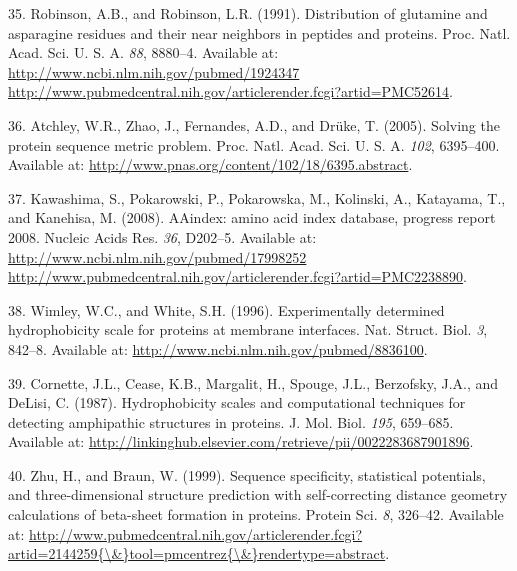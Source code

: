 \documentclass[12pt,a4paper,twoside]{book}
\theoremstyle{definition}
\theoremstyle{definition}
\theoremstyle{remark}
\begin{document}
\hypertarget{ref-Robinson1991}{}
35. Robinson, A.B., and Robinson, L.R. (1991). Distribution of glutamine
and asparagine residues and their near neighbors in peptides and
proteins. Proc. Natl. Acad. Sci. U. S. A. \emph{88}, 8880--4. Available
at:
\href{http://www.ncbi.nlm.nih.gov/pubmed/1924347\%20http://www.pubmedcentral.nih.gov/articlerender.fcgi?artid=PMC52614}{http://www.ncbi.nlm.nih.gov/pubmed/1924347 http://www.pubmedcentral.nih.gov/articlerender.fcgi?artid=PMC52614}.

\hypertarget{ref-Atchley2005}{}
36. Atchley, W.R., Zhao, J., Fernandes, A.D., and Drüke, T. (2005).
Solving the protein sequence metric problem. Proc. Natl. Acad. Sci. U.
S. A. \emph{102}, 6395--400. Available at:
\url{http://www.pnas.org/content/102/18/6395.abstract}.

\hypertarget{ref-Kawashima2008}{}
37. Kawashima, S., Pokarowski, P., Pokarowska, M., Kolinski, A.,
Katayama, T., and Kanehisa, M. (2008). AAindex: amino acid index
database, progress report 2008. Nucleic Acids Res. \emph{36}, D202--5.
Available at:
\href{http://www.ncbi.nlm.nih.gov/pubmed/17998252\%20http://www.pubmedcentral.nih.gov/articlerender.fcgi?artid=PMC2238890}{http://www.ncbi.nlm.nih.gov/pubmed/17998252 http://www.pubmedcentral.nih.gov/articlerender.fcgi?artid=PMC2238890}.

\hypertarget{ref-Wimley1996}{}
38. Wimley, W.C., and White, S.H. (1996). Experimentally determined
hydrophobicity scale for proteins at membrane interfaces. Nat. Struct.
Biol. \emph{3}, 842--8. Available at:
\url{http://www.ncbi.nlm.nih.gov/pubmed/8836100}.

\hypertarget{ref-Cornette1987}{}
39. Cornette, J.L., Cease, K.B., Margalit, H., Spouge, J.L., Berzofsky,
J.A., and DeLisi, C. (1987). Hydrophobicity scales and computational
techniques for detecting amphipathic structures in proteins. J. Mol.
Biol. \emph{195}, 659--685. Available at:
\url{http://linkinghub.elsevier.com/retrieve/pii/0022283687901896}.

\hypertarget{ref-Zhu1999}{}
40. Zhu, H., and Braun, W. (1999). Sequence specificity, statistical
potentials, and three-dimensional structure prediction with
self-correcting distance geometry calculations of beta-sheet formation
in proteins. Protein Sci. \emph{8}, 326--42. Available at:
\href{http://www.pubmedcentral.nih.gov/articlerender.fcgi?artid=2144259\%7B/\&\%7Dtool=pmcentrez\%7B/\&\%7Drendertype=abstract}{http://www.pubmedcentral.nih.gov/articlerender.fcgi?artid=2144259\{\textbackslash{}\&\}tool=pmcentrez\{\textbackslash{}\&\}rendertype=abstract}.
\end{document}
